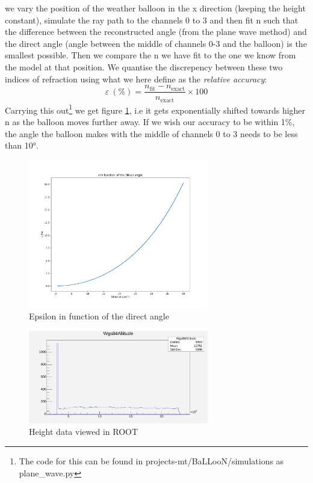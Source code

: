 \documentclass[11pt,a4paper,faculty=we,language=en,doctype=report]{cls/ugent-doc}
\begin{document}
we vary the position of the weather balloon in the x direction (keeping the
height constant), simulate the ray path to the channels 0 to 3 and then fit n
such that the difference between the reconstructed angle (from the plane wave
method) and the direct angle (angle between the middle of channels 0-3 and the
balloon) is the smallest possible.  Then we compare the n we have fit to the
one we know from the model at that position.  We quantise the discrepency
between these two indices of refraction using what we here define as the
\textit{relative accuracy}:
\begin{equation}
  \varepsilon\ (\%) = \frac{n_\text{fit} - n_{\text{exact}}}{n_{\text{exact}}} \times 100
\end{equation}
Carrying this out\footnote{The code for this can be found in projects-mt/BaLLooN/simulations as plane\_wave.py} we get figure \ref{fig:EpsilonIFODirect}, i.e it gets
exponentially shifted towards higher n as the balloon moves further away. If we wish our
accuracy to be within 1\%, the angle the balloon makes with the middle of channels 0 to 3 needs
to be less than 10°.
\begin{figure}
	\centering
	\includegraphics[width=0.7\textwidth]{EpsilonIFODirect.pdf}
	\caption{Epsilon in function of the direct angle}
	\label{fig:EpsilonIFODirect}
\end{figure}
\begin{figure}
  \centering
  \includegraphics[width=0.7\textwidth]{BobsWeatherBalloonHeight.pdf}
  \caption{Height data viewed in ROOT}
  \label{fig:BobsWeatherBalloonHeight}
\end{figure}
\end{document}
